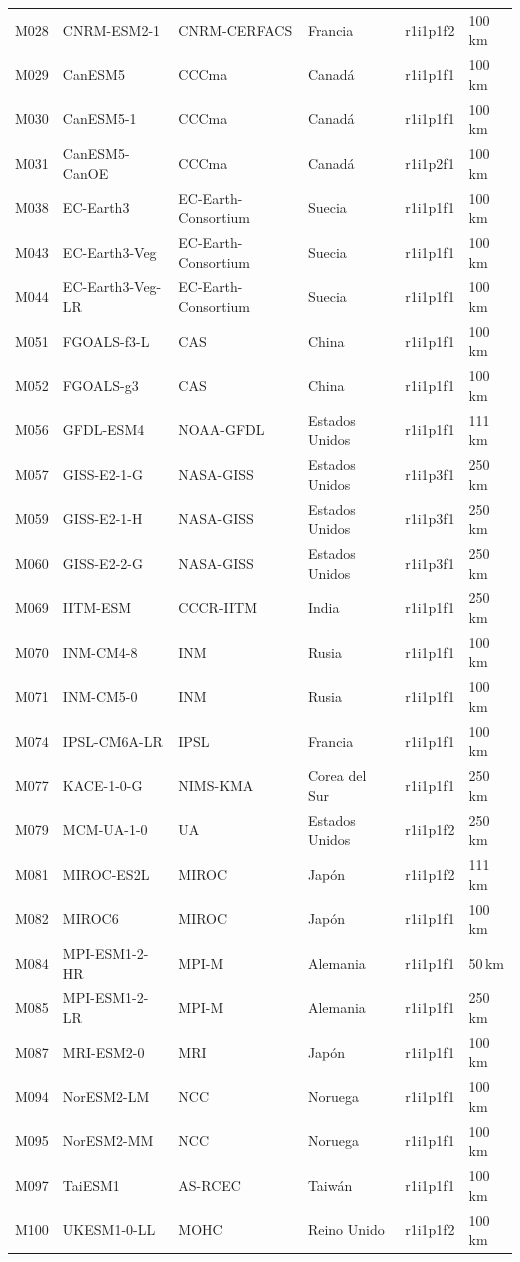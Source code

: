 \begin{longtable}{@{}L{1.3cm}L{2.9cm}L{3.5cm}L{2.5cm}L{2.1cm}L{\dimexpr\textwidth-12.3cm-10\tabcolsep\relax}@{}}
M028 & CNRM-ESM2-1 & CNRM-CERFACS & Francia & r1i1p1f2 & 100\,km \\
M029 & CanESM5 & CCCma & Canadá & r1i1p1f1 & 100\,km \\
M030 & CanESM5-1 & CCCma & Canadá & r1i1p1f1 & 100\,km \\
M031 & CanESM5-CanOE & CCCma & Canadá & r1i1p2f1 & 100\,km \\
M038 & EC-Earth3 & EC-Earth-Consortium & Suecia & r1i1p1f1 & 100\,km \\
M043 & EC-Earth3-Veg & EC-Earth-Consortium & Suecia & r1i1p1f1 & 100\,km \\
M044 & EC-Earth3-Veg-LR & EC-Earth-Consortium & Suecia & r1i1p1f1 & 100\,km \\
M051 & FGOALS-f3-L & CAS & China & r1i1p1f1 & 100\,km \\
M052 & FGOALS-g3 & CAS & China & r1i1p1f1 & 100\,km \\
M056 & GFDL-ESM4 & NOAA-GFDL & Estados Unidos & r1i1p1f1 & 111\,km \\
M057 & GISS-E2-1-G & NASA-GISS & Estados Unidos & r1i1p3f1 & 250\,km \\
M059 & GISS-E2-1-H & NASA-GISS & Estados Unidos & r1i1p3f1 & 250\,km \\
M060 & GISS-E2-2-G & NASA-GISS & Estados Unidos & r1i1p3f1 & 250\,km \\
M069 & IITM-ESM & CCCR-IITM & India & r1i1p1f1 & 250\,km \\
M070 & INM-CM4-8 & INM & Rusia & r1i1p1f1 & 100\,km \\
M071 & INM-CM5-0 & INM & Rusia & r1i1p1f1 & 100\,km \\
M074 & IPSL-CM6A-LR & IPSL & Francia & r1i1p1f1 & 100\,km \\
M077 & KACE-1-0-G & NIMS-KMA & Corea del Sur & r1i1p1f1 & 250\,km \\
M079 & MCM-UA-1-0 & UA & Estados Unidos & r1i1p1f2 & 250\,km \\
M081 & MIROC-ES2L & MIROC & Japón & r1i1p1f2 & 111\,km \\
M082 & MIROC6 & MIROC & Japón & r1i1p1f1 & 100\,km \\
M084 & MPI-ESM1-2-HR & MPI-M & Alemania & r1i1p1f1 & 50\,km \\
M085 & MPI-ESM1-2-LR & MPI-M & Alemania & r1i1p1f1 & 250\,km \\
M087 & MRI-ESM2-0 & MRI & Japón & r1i1p1f1 & 100\,km \\
M094 & NorESM2-LM & NCC & Noruega & r1i1p1f1 & 100\,km \\
M095 & NorESM2-MM & NCC & Noruega & r1i1p1f1 & 100\,km \\
M097 & TaiESM1 & AS-RCEC & Taiwán & r1i1p1f1 & 100\,km \\
M100 & UKESM1-0-LL & MOHC & Reino Unido & r1i1p1f2 & 100\,km \\
\end{longtable}
\endgroup

